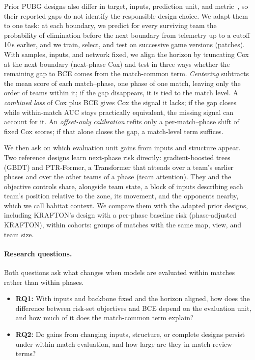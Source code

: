 \documentclass[sigconf,anonymous]{acmart}
\begin{document}
Prior PUBG designs also differ in target, inputs, prediction unit, and metric~\cite{Sagong25a,KRAFTON}, so their reported gaps do not identify the responsible design choice. We adapt them to one task: at each boundary, we predict for every surviving team the probability of elimination before the next boundary from telemetry up to a cutoff 10\,s earlier, and we train, select, and test on successive game versions (patches). With samples, inputs, and network fixed, we align the horizon by truncating Cox at the next boundary (next-phase Cox) and test in three ways whether the remaining gap to BCE comes from the match-common term. \emph{Centering} subtracts the mean score of each match--phase, one phase of one match, leaving only the order of teams within it; if the gap disappears, it is tied to the match level. A \emph{combined loss} of Cox plus BCE gives Cox the signal it lacks; if the gap closes while within-match AUC stays practically equivalent, the missing signal can account for it. An \emph{offset-only calibration} refits only a per-match--phase shift of fixed Cox scores; if that alone closes the gap, a match-level term suffices.

We then ask on which evaluation unit gains from inputs and structure appear. Two reference designs learn next-phase risk directly: gradient-boosted trees (GBDT) and PTR-Former, a Transformer that attends over a team's earlier phases and over the other teams of a phase (team attention). They and the objective controls share, alongside team state, a block of inputs describing each team's position relative to the zone, its movement, and the opponents nearby, which we call habitat context. We compare them with the adapted prior designs, including KRAFTON's design with a per-phase baseline risk (phase-adjusted KRAFTON), within cohorts: groups of matches with the same map, view, and team size.

\paragraph{Research questions.} Both questions ask what changes when models are evaluated within matches rather than within phases.
\begin{itemize}
\item \textbf{RQ1:} With inputs and backbone fixed and the horizon aligned, how does the difference between risk-set objectives and BCE depend on the evaluation unit, and how much of it does the match-common term explain?
\item \textbf{RQ2:} Do gains from changing inputs, structure, or complete designs persist under within-match evaluation, and how large are they in match-review terms?
\end{itemize}
\end{document}

